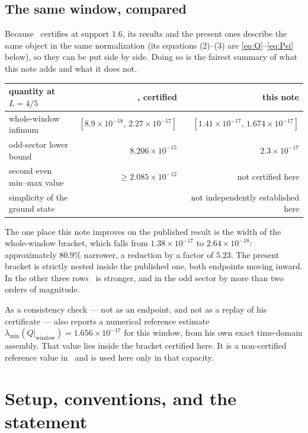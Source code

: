 \documentclass[11pt,a4paper]{article}
\theoremstyle{definition}
\theoremstyle{remark}
\begin{document}
\subsection{The same window, compared}
\label{sec:compared}

Because~\cite{Zhu} certifies at support $1.6$, its results and the present ones
describe the same object in the same normalization (its equations (2)--(3) are
\eqref{eq:Q}--\eqref{eq:Psi} below), so they can be put side by side. Doing so is
the fairest summary of what this note adds and what it does not.

\begin{center}
\begin{tabular}{lrr}
\toprule
quantity at $L = 4/5$ & \cite{Zhu}, certified & this note \\
\midrule
whole-window infimum
  & $[8.9\times10^{-18},\, 2.27\times10^{-17}]$
  & $[1.41\times10^{-17},\, 1.674\times10^{-17}]$ \\
odd-sector lower bound
  & $8.206\times10^{-15}$
  & $2.3\times10^{-17}$ \\
second even min--max value
  & $\ge 2.085\times10^{-12}$
  & not certified here \\
simplicity of the ground state
  & \cite[Thm.~6.2]{Zhu}
  & not independently established here \\
\bottomrule
\end{tabular}
\end{center}

The one place this note improves on the published result is the width of the
whole-window bracket, which falls from $1.38\times10^{-17}$ to
$2.64\times10^{-18}$: approximately $80.9\%$ narrower, a reduction by a factor
of $5.23$. The present bracket is strictly nested inside the published one, both
endpoints moving inward. In the other three rows~\cite{Zhu} is stronger, and in
the odd sector by more than two orders of magnitude.

As a consistency check --- not as an endpoint, and not as a replay of his
certificate --- \cite{Zhu} also reports a numerical reference estimate
$\lambda_{\min}(Q|_{\text{window}}) = 1.656\times10^{-17}$ for this window, from
his own exact time-domain assembly. That value lies inside the bracket certified
here. It is a non-certified reference value in~\cite{Zhu} and is used here only
in that capacity.

\section{Setup, conventions, and the statement}
\label{sec:setup}
\end{document}

